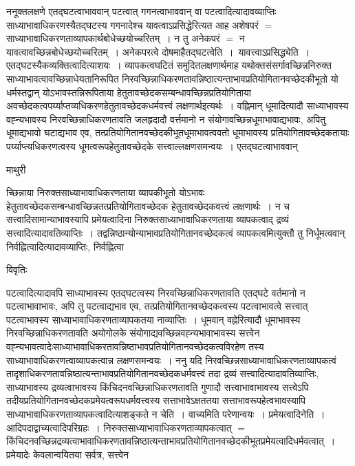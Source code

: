 \documentclass[10pt, openany]{book}
\begin{document}
{ननूक्तलक्षणे एतद्घटत्वाभाववान् पटत्वात् गगनत्वाभाववान् वा पटत्वादित्यादावव्याप्तिः साध्याभावाधिकरणस्यैतद्घटस्य गगनादेश्च यावत्वाऽप्रसिद्धेरित्यत
आह अशेषपरं $=$  साध्याभावाधिकरणताव्यापकार्थबोधेच्छयोच्चरितम्~। न तु अनेकपरं $=$ न यावत्वावच्छिन्नबोधेच्छयोच्चरितम्~।
अनेकपरत्वे दोषमाहैतद्घटत्वेति~।~{\la यावत्त्वाऽप्रसिद्ध्येति~।} एतद्घटस्यैकव्यक्तित्वादित्याशयः~। व्यापकत्वघटितं समुदितलक्षणार्थमाह  यथोक्तसंसर्गावच्छिन्ननिरुक्त साध्याभावत्वावच्छिन्नाधेयतानिरूपित निरवच्छिन्नाधिकरणतावन्निष्ठात्यन्ताभावप्रतियोगितानवच्छेदकीभूतो यो धर्मस्तद्वान्
योऽभावस्तन्निरूपिताया हेतुतावच्छेदकसम्बन्धावच्छिन्नप्रतियोगिताया अवच्छेदकत्वपर्य्याप्तव्यधिकरणहेतुतावच्छेदकधर्मवत्त्वं लक्षणार्थइत्यर्थः~। वह्निमान् धूमादित्यादौ साध्याभावस्य वह्न्यभावस्य निरवच्छिन्नाधिकरणतावति जलहृदादौ वर्त्तमानो न संयोगावच्छिन्नधूमाभावाद्यभावः, अपितु धूमाद्यभावो घटाद्यभाव एव, तत्प्रतियोगितानवच्छेदकीभूतधूमाभावत्ववतो धूमाभावस्य प्रतियोगितावच्छेदकतायाः पर्य्याप्त्यधिकरणत्वस्य धूमत्वरूपहेतुतावच्छेदके सत्त्वाल्लक्षणसमन्वयः~। एतद्घटत्वाभाववान्
\newpage
 \begin{center}  माथुरी  \end{center} 
{\la च्छिन्नाया निरुक्तसाध्याभावाधिकरणताया व्यापकीभूतो योऽभावः हेतुतावच्छेदकसम्बन्धावच्छिन्नतत्प्रतियोगितावच्छेदक हेतुतावच्छेदकवत्त्वं लक्षणार्थः~। न च सत्त्वादिसामान्याभावस्यापि प्रमेयत्वादिना  निरुक्तसाध्याभावाधिकरणताया व्यापकत्वाद् द्रव्यं सत्त्वादित्यादावतिव्याप्तिः~। तद्वन्निष्ठान्योन्याभावप्रतियोगितानवच्छेदकत्वं व्यापकत्वमित्युक्तौ तु निर्धूमत्ववान् निर्वह्नित्वादित्यादावव्याप्तिः, निर्वह्नित्वा}
\begin{center}     विवृतिः \end{center}
पटत्वादित्यादावपि साध्याभावस्य एतद्घटत्वस्य निरवच्छिन्नाधिकरणतावति एतद्घटे वर्तमानो न पटत्वाभावाभावः, अपि तु पटत्वाद्यभाव एव, तत्प्रतियोगितानवच्छेदकत्वस्य पटत्वाभावत्वे सत्त्वात् पटत्वाभावस्य साध्याभावाधिकरणताव्यापकतया नाव्याप्तिः~। धूमवान् वह्नेरित्यादौ धूमाभावस्य निरवच्छिन्नाधिकरणतावति अयोगोलके संयोगाद्यवच्छिन्नवह्न्यभावाभावस्य सत्त्वेन वह्न्यभावत्वादेःसाध्याभावाधिकरतावन्निष्ठाभावप्रतियोगितानवच्छेदकत्वविरहेण तस्य साध्याभावाधिकरणत्वाव्यापकत्वान्न लक्षणसमन्वयः~। ननु यदि निरवच्छिन्नसाध्याभावाधिकरणताव्यापकत्वं तादृशाधिकरणतावन्निष्ठात्यन्ताभावप्रतियोगितानवच्छेदकधर्मवत्त्वं तदा द्रव्यं सत्त्वादित्यादावतिव्याप्तिः,
साध्याभावस्य द्रव्यत्वाभावस्य किंचिदनवच्छिन्नाधिकरणतावति गुणादौ सत्त्वाभावाभावस्य सत्त्वेऽपि तदीयप्रतियोगितानवच्छेदकप्रमेयत्वरूपधर्मवत्त्वस्य सत्ताभावेऽक्षततया
सत्ताभावरूपहेत्वभावस्यापि साध्याभावाधिकरणताव्यापकत्वादित्याशङ्कते  {\qt न चेति~।} वाच्यमिति परेणान्वयः~। प्रमेयत्वादिनेति~। आदिपदाद्वाच्यत्वादिपरिग्रहः~। निरुक्तसाध्याभावाधिकरणताव्यापकत्वात् $=$ किंचिदनवच्छिन्नद्रव्यत्वाभावाधिकरणतावन्निष्ठात्यन्ताभावप्रतियोगितानवच्छेदकीभूतप्रमेयत्वादिधर्मवत्वात्~। प्रमेयादेः केवलान्वयितया सर्वत्र, सत्त्वेन
}
\end{document}
